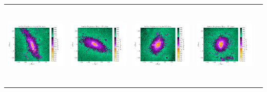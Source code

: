 \begin{tabular}{c c c c c}
 \hspace*{-1cm}\includegraphics[height=4cm,width=4cm,trim={2.5cm 1.5cm 5cm 1.5cm},clip]{../pngs/D18.png}  & 
 \hspace*{-.3cm}\includegraphics[height=4cm,width=4cm,trim={2.5cm 1.5cm 5cm 1.5cm},clip]{../pngs/D19.png}  & 
 \hspace*{-.3cm}\includegraphics[height=4cm,width=4cm,trim={2.5cm 1.5cm 5cm 1.5cm},clip]{../pngs/D20.png}  & 
 \hspace*{-.3cm}\includegraphics[height=4cm,width=4cm,trim={2.5cm 1.5cm 5cm 1.5cm},clip]{../pngs/D21.png}  &
 \\ 


\end{tabular}

